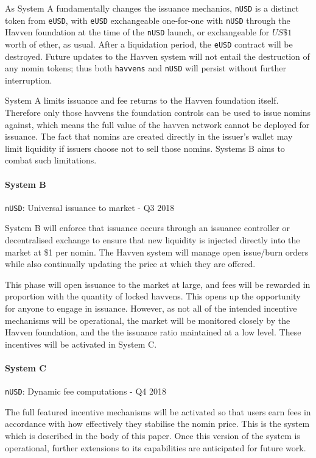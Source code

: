 As System A fundamentally changes the issuance mechanics, \texttt{nUSD} is a distinct
token from \texttt{eUSD}, with \texttt{eUSD} exchangeable one-for-one with \texttt{nUSD}
through the Havven foundation at the time of the \texttt{nUSD} launch, or exchangeable
for \(US\$1\) worth of ether, as usual. After a liquidation period, the \texttt{eUSD} contract
will be destroyed.
Future updates to the Havven system will not entail the destruction of any nomin tokens; thus
both \texttt{havvens} and \texttt{nUSD} will persist without further interruption.

System A limits issuance and fee returns to the Havven foundation itself. Therefore
only those havvens the foundation controls can be used to issue nomins against, which means
the full value of the havven network cannot be deployed for issuance. The fact that nomins
are created directly in the issuer's wallet may limit liquidity if issuers choose not to sell
those nomins. Systems B aims to combat such limitations.


\paragraph{System B} \texttt{nUSD}: Universal issuance to market - Q3 2018

System B will enforce that issuance occurs through an issuance controller or
decentralised exchange to ensure that new liquidity is injected directly
into the market at \$1 per nomin. The Havven system will manage open
issue/burn orders while also continually updating the price at which they are
offered.

This phase will open issuance to the market at large, and fees will be rewarded
in proportion with the quantity of locked havvens. This opens up the opportunity
for anyone to engage in issuance. However, as not all of the intended incentive
mechanisms will be operational, the market will be monitored closely by the Havven
foundation, and the the issuance ratio maintained at a low level. These incentives will
be activated in System C.


\paragraph{System C} \texttt{nUSD}: Dynamic fee computations - Q4 2018

The full featured incentive mechanisms will be activated so that users earn fees
in accordance with how effectively they stabilise the nomin price. This is the
system which is described in the body of this paper. Once this version of the system
is operational, further extensions to its capabilities are anticipated for future work.


